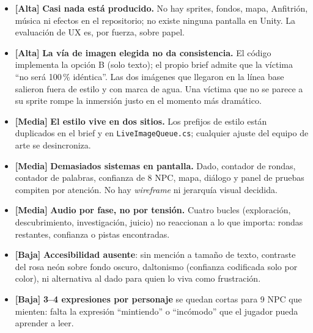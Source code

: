 \documentclass[11pt,a4paper]{article}
\newcommand{\file}[1]{\texttt{\small #1}}
\newcommand{\prio}[1]{\textbf{\color{neon}[#1]}}
\begin{document}
\begin{debil}
\begin{itemize}
\item \prio{Alta} \textbf{Casi nada está producido.} No hay sprites, fondos, mapa, Anfitrión, música
ni efectos en el repositorio; no existe ninguna pantalla en Unity. La evaluación de UX es, por
fuerza, sobre papel.
\item \prio{Alta} \textbf{La vía de imagen elegida no da consistencia.} El código implementa la
opción B (solo texto); el propio brief admite que la víctima ``no será 100\,\% idéntica''. Las dos
imágenes que llegaron en la línea base salieron fuera de estilo y con marca de agua. Una víctima que
no se parece a su sprite rompe la inmersión justo en el momento más dramático.
\item \prio{Media} \textbf{El estilo vive en dos sitios.} Los prefijos de estilo están duplicados en
el brief y en \file{LiveImageQueue.cs}; cualquier ajuste del equipo de arte se desincroniza.
\item \prio{Media} \textbf{Demasiados sistemas en pantalla.} Dado, contador de rondas, contador de
palabras, confianza de 8 NPC, mapa, diálogo y panel de pruebas compiten por atención. No hay
\emph{wireframe} ni jerarquía visual decidida.
\item \prio{Media} \textbf{Audio por fase, no por tensión.} Cuatro bucles (exploración,
descubrimiento, investigación, juicio) no reaccionan a lo que importa: rondas restantes, confianza
o pistas encontradas.
\item \prio{Baja} \textbf{Accesibilidad ausente}: sin mención a tamaño de texto, contraste del rosa
neón sobre fondo oscuro, daltonismo (confianza codificada solo por color), ni alternativa al dado
para quien lo viva como frustración.
\item \prio{Baja} \textbf{3--4 expresiones por personaje} se quedan cortas para 9 NPC que mienten:
falta la expresión ``mintiendo'' o ``incómodo'' que el jugador pueda aprender a leer.
\end{itemize}
\end{debil}
\end{document}
